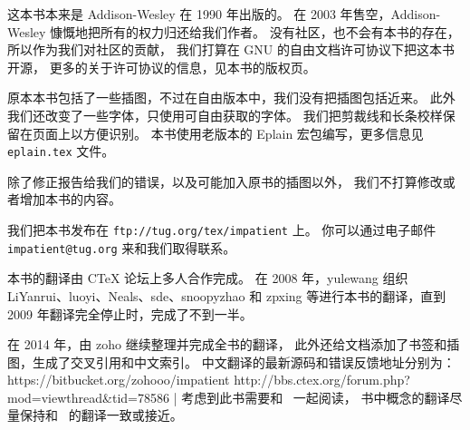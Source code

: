 %


\baselineskip

 这本书本来是 Addison-Wesley 在 1990 年出版的。
在 2003 年售空，Addison-Wesley 慷慨地把所有的权力归还给我们作者。
没有社区，也不会有本书的存在，所以作为我们对社区的贡献，
我们打算在 GNU 的自由文档许可协议下把这本书开源，
更多的关于许可协议的信息，见本书的版权页。

原本本书包括了一些插图，不过在自由版本中，我们没有把插图包括近来。
此外我们还改变了一些字体，只使用可自由获取的字体。
我们把剪裁线和长条校样保留在页面上以方便识别。
本书使用老版本的 Eplain 宏包编写，更多信息见 {\tt eplain.tex} 文件。

除了修正报告给我们的错误，以及可能加入原书的插图以外，
我们不打算修改或者增加本书的内容。

我们把本书发布在 {\tt ftp://tug.org/tex/impatient} 上。
你可以通过电子邮件 {\tt impatient@tug.org} 来和我们取得联系。

\baselineskip

本书的翻译由 CTeX 论坛上多人合作完成。
在 2008 年，yulewang 组织 LiYanrui、luoyi、Neals、sde、snoopyzhao
和 zpxing 等进行本书的翻译，直到 2009 年翻译完全停止时，完成了不到一半。

在 2014 年，由 zoho 继续整理并完成全书的翻译，
此外还给文档添加了书签和插图，生成了交叉引用和中文索引。
中文翻译的最新源码和错误反馈地址分别为：
\csdisplay
https://bitbucket.org/zohooo/impatient
http://bbs.ctex.org/forum.php?mod=viewthread&tid=78586
|
考虑到此书需要和 \texbook\ 一起阅读，
书中概念的翻译尽量保持和 \texbook\ 的翻译一致或接近。

\pagebreak
\byebye
